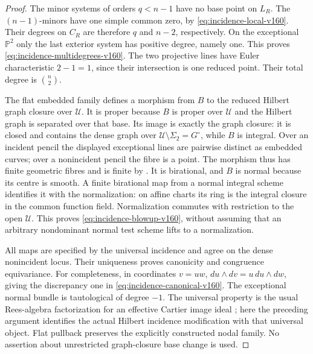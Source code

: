 \documentclass[11pt,reqno]{amsart}
\numberwithin{equation}{section}
\theoremstyle{definition}\newtheorem{definition}[theorem]{Definition}
\theoremstyle{remark}\newtheorem{remark}[theorem]{Remark}
\newcommand{\Pj}{\mathbb P}\newcommand{\A}{\mathbb A}
\begin{document}
\begin{proof}
The minor systems of orders $q<n-1$ have no base point on $L_R$.
The $(n-1)$-minors have one simple common zero, by
\eqref{eq:incidence-local-v160}. Their degrees on $C_R$ are therefore
$q$ and $n-2$, respectively. On the exceptional $\Pj^2$ only the
last exterior system has positive degree, namely one. This proves
\eqref{eq:incidence-multidegrees-v160}. The two projective lines
have Euler characteristic $2-1=1$, since their intersection is one
reduced point. Their total degree is $\binom n2$.

The flat embedded family defines a morphism from $B$ to the reduced
Hilbert graph closure over $\mathcal U$. It is proper because $B$ is
proper over $\mathcal U$ and the Hilbert graph is separated over that
base. Its image is exactly the graph closure: it is closed and contains
the dense graph over $\mathcal U\setminus\Sigma_2=G^\circ$, while
$B$ is integral. Over an incident pencil the displayed exceptional
lines are pairwise distinct as embedded curves; over a nonincident
pencil the fibre is a point. The morphism thus has finite geometric
fibres and is finite by \cite[Tag~02LS]{StacksProject160}. It is
birational, and $B$ is normal because its centre is smooth. A finite
birational map from a normal integral scheme identifies it with the
normalization: on affine charts its ring is the integral closure in
the common function field. Normalization commutes with restriction
to the open $\mathcal U$. This proves
\eqref{eq:incidence-blowup-v160}, without assuming that an arbitrary
nondominant normal test scheme lifts to a normalization.

All maps are specified by the universal incidence and agree on the
dense nonincident locus. Their uniqueness proves canonicity and
congruence equivariance. For completeness, in coordinates $v=uw$,
$du\wedge dv=u\,du\wedge dw$, giving the discrepancy one in
\eqref{eq:incidence-canonical-v160}. The exceptional normal bundle
is tautological of degree $-1$. The universal property is the usual
Rees-algebra factorization for an effective Cartier image ideal
\cite[Tag~0806]{StacksProject160}; here the preceding argument
identifies the actual Hilbert incidence modification with that
universal object. Flat pullback preserves the explicitly constructed
nodal family. No assertion about unrestricted graph-closure base
change is used.
\end{proof}
\end{document}
